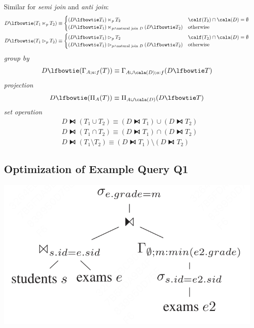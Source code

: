 \documentclass[11pt]{article}
\begin{document}
Similar for \emph{semi join} and \emph{anti join}:
\begin{align*}
&D\lfbowtie(T_1\ltimes_pT_2)\equiv
\begin{cases}
(D\lfbowtie T_1)\ltimes_pT_2&\calf(T_2)\cap\cala(D)=\emptyset\\
(D\lfbowtie T_1)\ltimes_{p\wedge\text{natural join }D}(D\lfbowtie T_2)&\text{otherwise}
\end{cases}\\
&D\lfbowtie(T_1\rhd_pT_2)\equiv
\begin{cases}
(D\lfbowtie T_1)\rhd_pT_2&\calf(T_2)\cap\cala(D)=\emptyset\\
(D\lfbowtie T_1)\rhd_{p\wedge\text{natural join }D}(D\lfbowtie T_2)&\text{otherwise}
\end{cases}
\end{align*}
\emph{group by}
\begin{equation*}
D\lfbowtie(\Gamma_{A;a:f}(T))\equiv\Gamma_{A\cup\cala(D);a:f}(D\lfbowtie T)
\end{equation*}
\emph{projection}
\begin{equation*}
D\lfbowtie(\Pi_A(T))\equiv\Pi_{A\cup\cala(D)}(D\lfbowtie T)
\end{equation*}
\emph{set operation}
\begin{align*}
&D\lfbowtie(T_1\cup T_2)\equiv(D\lfbowtie T_1)\cup(D\lfbowtie T_2)\\
&D\lfbowtie(T_1\cap T_2)\equiv(D\lfbowtie T_1)\cap(D\lfbowtie T_2)\\
&D\lfbowtie(T_1\setminus T_2)\equiv(D\lfbowtie T_1)\setminus(D\lfbowtie T_2)
\end{align*}
\subsection{Optimization of Example Query Q1}
\label{sec:org4e5dc78}
\begin{center}
\includegraphics[width=.6\textwidth]{../../images/papers/86.png}
\end{center}
\end{document}
